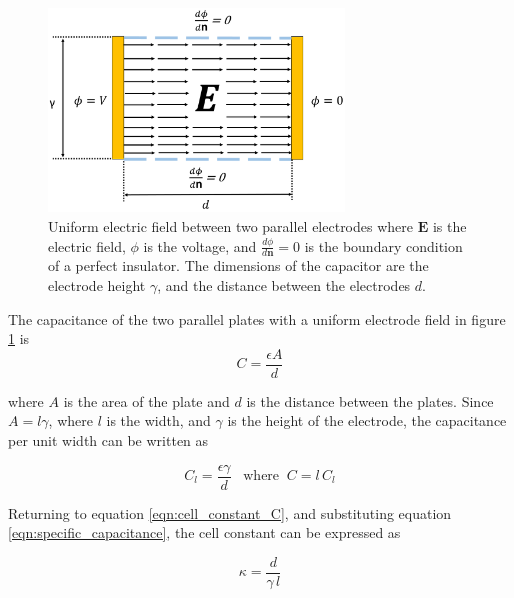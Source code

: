    \begin{figure}[ht]
  \centering
  \includegraphics[width=0.7\textwidth]{images/capacitorNoFringe.png}
  \caption[Uniform electric field between parallel plates]{Uniform electric field between two parallel electrodes where $\boldsymbol{E}$ is the electric field, $\phi$ is the voltage, and $\frac{d\phi}{d\boldsymbol{n}}=0$ is the boundary condition of a perfect insulator. The dimensions of the capacitor are the electrode height $\gamma$, and the distance between the electrodes $d$.}
  \label{fig:parallel_capacitor}
  \end{figure}
  
  \par The capacitance of the two parallel plates with a uniform electrode field in figure \ref{fig:parallel_capacitor} is
  \begin{equation}
      C = \frac{\epsilon A}{d}
      \label{eqn:capacitor}
  \end{equation}
  
  \noindent where $A$ is the area of the plate and $d$ is the distance between the plates. Since $A = l\gamma$, where $l$ is the width, and $\gamma$ is the height of the electrode, the capacitance per unit width can be written as
  
  \begin{equation}
      C_l = \frac{\epsilon\gamma}{d} \;\;\;\text{where} \;\; C =l\, C_l
      \label{eqn:specific_capacitance}
  \end{equation}
  
  \par Returning to equation \ref{eqn:cell_constant_C}, and substituting equation \ref{eqn:specific_capacitance}, the cell constant can be expressed as 
  
  \begin{equation}
      \kappa = \frac{d}{\gamma \, l}
      \label{eqn:cell_constant}
  \end{equation}
  
